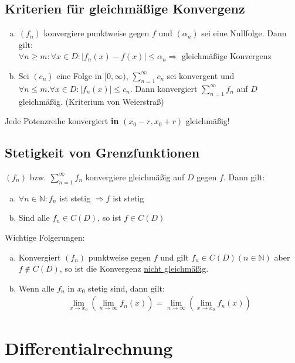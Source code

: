 \documentclass{article}
\begin{document}
\subsection{Kriterien für gleichmäßige Konvergenz}
\begin{enumerate}[a)]
    \item $(f_n)$ konvergiere punktweise gegen $f$ und $(\alpha_n)$ sei eine Nullfolge. Dann gilt: \\
    $\forall n \geq m: \forall x \in D: |f_n(x) - f(x)| \leq \alpha_n \Rightarrow$ gleichmäßige Konvergenz
    \item Sei $(c_n)$ eine Folge in $[0,\infty)$, $\sum \limits_{n=1}^{\infty} c_n$ sei konvergent und $\forall n \leq m. \forall x \in D: |f_n(x)| \leq c_n$.
    Dann konvergiert $\sum \limits_{n=1}^{\infty} f_n$ auf $D$ gleichmäßig. (Kriterium von Weierstraß)
\end{enumerate}
Jede Potenzreihe konvergiert \textbf{in} $(x_0-r, x_0+r)$ gleichmäßig!

\subsection{Stetigkeit von Grenzfunktionen}
$(f_n)$ bzw. $\sum \limits_{n=1}^{\infty} f_n$ konvergiere gleichmäßig auf $D$ gegen $f$. Dann gilt: \\
\begin{enumerate}[a)]
    \item $\forall n \in \mathbb{N}: f_n$ ist stetig $\Rightarrow f$ ist stetig
    \item Sind alle $f_n \in C(D)$, so ist $f \in C(D)$
\end{enumerate}
Wichtige Folgerungen:
\begin{enumerate} [a)]
    \item Konvergiert $(f_n)$ punktweise gegen $f$ und gilt $f_n \in C(D) (n \in \mathbb{N})$ aber $f \notin C(D)$, so ist die Konvergenz \underline{nicht gleichmäßig}. 
    \item Wenn alle $f_n$ in $x_0$ stetig sind, dann gilt: 
    \begin{align*}
        \lim \limits_{x \to x_0} (\lim \limits_{n \to \infty} f_n(x)) =  \lim \limits_{n \to \infty} (\lim \limits_{x \to x_0} f_n(x))
    \end{align*}
\end{enumerate}

\newpage


\section{Differentialrechnung}
\end{document}
